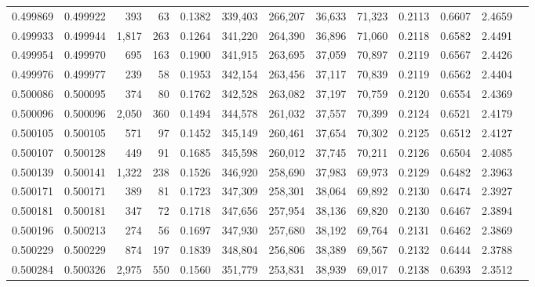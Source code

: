 \begin{tabular}{rrrrrrrrrrrrr}
0.499869 & 0.499922 &   393 &    63 &                                     0.1382 & 339,403 & 266,207 &  36,633 &  71,323 & 0.2113 & 0.6607 & 2.4659 \\
0.499933 & 0.499944 & 1,817 &   263 &                                     0.1264 & 341,220 & 264,390 &  36,896 &  71,060 & 0.2118 & 0.6582 & 2.4491 \\
0.499954 & 0.499970 &   695 &   163 &                                     0.1900 & 341,915 & 263,695 &  37,059 &  70,897 & 0.2119 & 0.6567 & 2.4426 \\
0.499976 & 0.499977 &   239 &    58 &                                     0.1953 & 342,154 & 263,456 &  37,117 &  70,839 & 0.2119 & 0.6562 & 2.4404 \\
0.500086 & 0.500095 &   374 &    80 &                                     0.1762 & 342,528 & 263,082 &  37,197 &  70,759 & 0.2120 & 0.6554 & 2.4369 \\
0.500096 & 0.500096 & 2,050 &   360 &                                     0.1494 & 344,578 & 261,032 &  37,557 &  70,399 & 0.2124 & 0.6521 & 2.4179 \\
0.500105 & 0.500105 &   571 &    97 &                                     0.1452 & 345,149 & 260,461 &  37,654 &  70,302 & 0.2125 & 0.6512 & 2.4127 \\
0.500107 & 0.500128 &   449 &    91 &                                     0.1685 & 345,598 & 260,012 &  37,745 &  70,211 & 0.2126 & 0.6504 & 2.4085 \\
0.500139 & 0.500141 & 1,322 &   238 &                                     0.1526 & 346,920 & 258,690 &  37,983 &  69,973 & 0.2129 & 0.6482 & 2.3963 \\
0.500171 & 0.500171 &   389 &    81 &                                     0.1723 & 347,309 & 258,301 &  38,064 &  69,892 & 0.2130 & 0.6474 & 2.3927 \\
0.500181 & 0.500181 &   347 &    72 &                                     0.1718 & 347,656 & 257,954 &  38,136 &  69,820 & 0.2130 & 0.6467 & 2.3894 \\
0.500196 & 0.500213 &   274 &    56 &                                     0.1697 & 347,930 & 257,680 &  38,192 &  69,764 & 0.2131 & 0.6462 & 2.3869 \\
0.500229 & 0.500229 &   874 &   197 &                                     0.1839 & 348,804 & 256,806 &  38,389 &  69,567 & 0.2132 & 0.6444 & 2.3788 \\
0.500284 & 0.500326 & 2,975 &   550 &                                     0.1560 & 351,779 & 253,831 &  38,939 &  69,017 & 0.2138 & 0.6393 & 2.3512 \\

\end{tabular}

